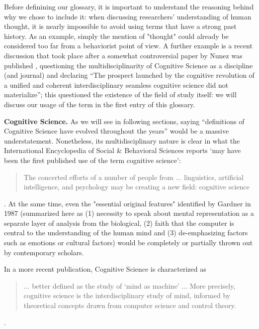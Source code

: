 \documentclass[../main.tex]{subfiles}
\begin{document}
Before definining our glossary, it is important to understand the reasoning behind why we chose to include it: when discussing researchers' understanding of human thought, it is nearly impossible to avoid using terms that have a strong past history. As an example, simply the mention of "thought" could already be considered too far from a behaviorist point of view. A further example is a recent discussion that took place after a somewhat controversial paper by Nunez was published \cite{nunezWhatHappenedCognitive2019}, questioning the multidisciplinarity of Cognitive Science as a discipline (and journal) and declaring \enquote{The prospect launched by the cognitive revolution of a unified and coherent interdisciplinary seamless cognitive science did not materialize}; this questioned the existence of the field of study itself: we will discuss our usage of the term in the first entry of this glossary.


\vspace{5pt}
\textbf{Cognitive Science.} As we will see in following sections, saying \enquote{definitions of Cognitive Science have evolved throughout the years} would be a massive understatement. Nonetheless, its multidisciplinary nature is clear in what the International Encyclopedia of Social \& Behavioral Sciences \cite{InternationalEncyclopediaSocial} reports \enquote*{may have been the first published use of the term cognitive science}:
\begin{quote}
    The concerted efforts of a number of people from ... linguistics, artificial intelligence, and psychology may be creating a new field: cognitive science
\end{quote}. At the same time, even the "essential original features" identified by Gardner in 1987 \cite{gardnerMindNewScience1987} (summarized here as (1) necessity to speak about mental representation as a separate layer of analysis from the biological, (2) faith that the computer is central to the understanding of the human mind and (3) de-emphasizing factors such as emotions or cultural factors) would be completely or partially thrown out by contemporary scholars.

In a more recent publication\cite{bodenMindMachineHistory2008}, Cognitive Science is characterized as
\begin{quote}
    ... better defined as the study of ‘mind as machine’ ... More precisely, cognitive science is the interdisciplinary study of mind, informed by theoretical concepts drawn from computer science and control theory.
\end{quote}.
\end{document}
